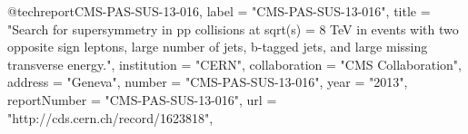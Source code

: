 @techreport{CMS-PAS-SUS-13-016,
      label          = "CMS-PAS-SUS-13-016",
      title         = "{Search for supersymmetry in pp collisions at sqrt(s) = 8
                       TeV in events
with two opposite sign leptons, large number
                       of jets, b-tagged jets,
and large missing transverse
                       energy.}",
      institution   = "CERN",
      collaboration = "CMS Collaboration",
      address       = "Geneva",
      number        = "CMS-PAS-SUS-13-016",
      year          = "2013",
      reportNumber  = "CMS-PAS-SUS-13-016",
      url           = "http://cds.cern.ch/record/1623818",
}

